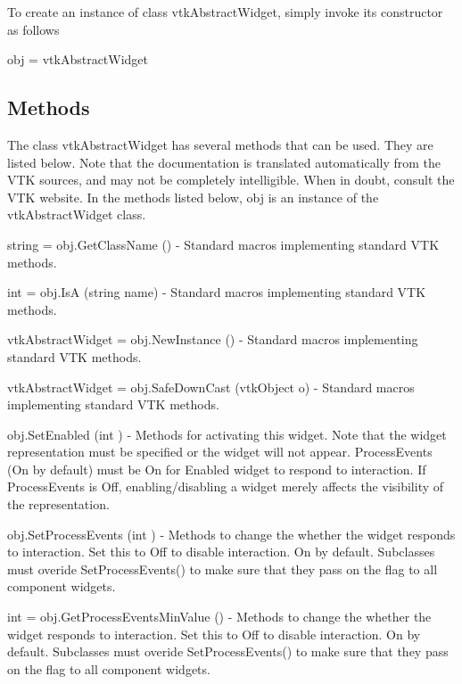 To create an instance of class vtk\-Abstract\-Widget, simply invoke its constructor as follows \begin{DoxyVerb}  obj = vtkAbstractWidget
\end{DoxyVerb}
 \hypertarget{vtkwidgets_vtkxyplotwidget_Methods}{}\subsection{Methods}\label{vtkwidgets_vtkxyplotwidget_Methods}
The class vtk\-Abstract\-Widget has several methods that can be used. They are listed below. Note that the documentation is translated automatically from the V\-T\-K sources, and may not be completely intelligible. When in doubt, consult the V\-T\-K website. In the methods listed below, {\ttfamily obj} is an instance of the vtk\-Abstract\-Widget class. 
\begin{DoxyItemize}
\item {\ttfamily string = obj.\-Get\-Class\-Name ()} -\/ Standard macros implementing standard V\-T\-K methods.  
\item {\ttfamily int = obj.\-Is\-A (string name)} -\/ Standard macros implementing standard V\-T\-K methods.  
\item {\ttfamily vtk\-Abstract\-Widget = obj.\-New\-Instance ()} -\/ Standard macros implementing standard V\-T\-K methods.  
\item {\ttfamily vtk\-Abstract\-Widget = obj.\-Safe\-Down\-Cast (vtk\-Object o)} -\/ Standard macros implementing standard V\-T\-K methods.  
\item {\ttfamily obj.\-Set\-Enabled (int )} -\/ Methods for activating this widget. Note that the widget representation must be specified or the widget will not appear. Process\-Events (On by default) must be On for Enabled widget to respond to interaction. If Process\-Events is Off, enabling/disabling a widget merely affects the visibility of the representation.  
\item {\ttfamily obj.\-Set\-Process\-Events (int )} -\/ Methods to change the whether the widget responds to interaction. Set this to Off to disable interaction. On by default. Subclasses must overide Set\-Process\-Events() to make sure that they pass on the flag to all component widgets.  
\item {\ttfamily int = obj.\-Get\-Process\-Events\-Min\-Value ()} -\/ Methods to change the whether the widget responds to interaction. Set this to Off to disable interaction. On by default. Subclasses must overide Set\-Process\-Events() to make sure that they pass on the flag to all component widgets.  

\end{DoxyItemize}
